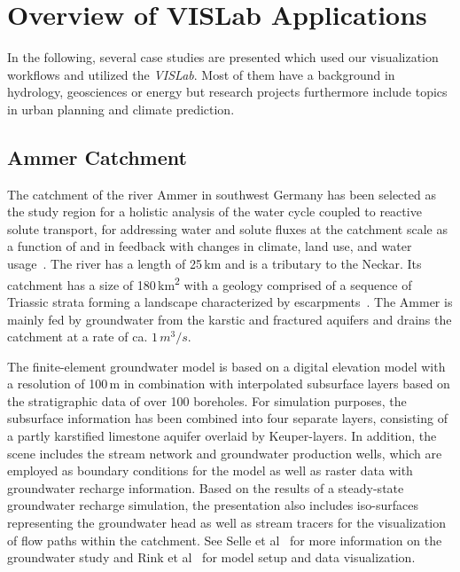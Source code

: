 \documentclass[twocolumn]{svjour3}          %
\begin{document}
\section{Overview of VISLab Applications}
\label{overview-of-VISLab-applications}

In the following, several case studies are presented which used our visualization workflows and utilized the \emph{VISLab}. Most of them have a background in hydrology, geosciences or energy but research projects furthermore include topics in urban planning and climate prediction.

\subsection{Ammer Catchment}
\label{ammer-catchment}

The catchment of the river Ammer in southwest Germany has been selected as the study region for a holistic analysis of the water cycle coupled to reactive solute transport, for addressing water and solute fluxes at the catchment scale as a function of and in feedback with changes in climate, land use, and water usage~\cite{grathwohl:wessti}. The river has a length of 25\,km and is a tributary to the Neckar. Its catchment has a size of 180\,km\textsuperscript{2} with a geology comprised of a sequence of Triassic strata forming a landscape characterized by escarpments~\cite{selle:wessti}. The Ammer is mainly fed by groundwater from the karstic and fractured aquifers and drains the catchment at a rate of ca. $1\,m^3/s$.

The finite-element groundwater model is based on a digital elevation model with a resolution of 100\,m in combination with interpolated subsurface layers based on the stratigraphic data of over 100 boreholes. For simulation purposes, the subsurface information has been combined into four separate layers, consisting of a part\-ly karstified limestone aquifer overlaid by Keuper-layers. In addition, the scene includes the stream network and groundwater production wells, which are employed as boundary conditions for the model as well as raster data with groundwater recharge information. Based on the results of a steady-state groundwater recharge simulation, the presentation also includes iso-surfaces representing the groundwater head as well as stream tracers for the visualization of flow paths within the catchment. See Selle et al~\cite{selle:wessti} for more information on the groundwater study and Rink et al~\cite{rink:wessti} for model setup and data visualization.
\end{document}
